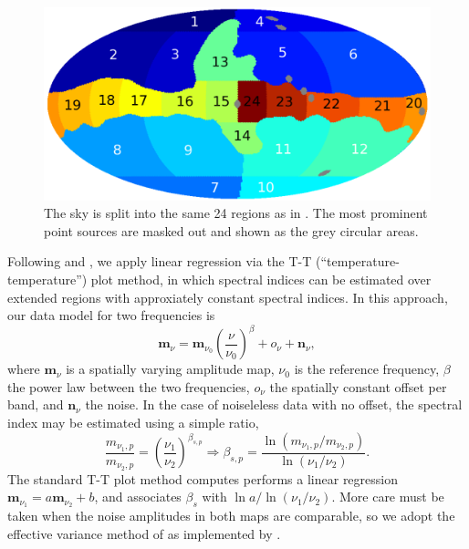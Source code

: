 \documentclass[twocolumn]{../../common/aa}
\begin{document}
\begin{figure}
        \centering
        \includegraphics[width=\linewidth]{figures/utnymaske_tall_converted.pdf}
        \caption{The sky is split into the same 24 regions as in \citet{fuskeland2014}. The most prominent point sources are masked out and shown as the grey circular areas.
        }
        \label{fig:regions}
\end{figure}


Following \citet{fuskeland2014} and \citet{fuskeland:2019}, we apply linear regression via the T-T (``temperature-temperature'') plot method, in which spectral indices can be estimated over extended regions with approxiately constant spectral indices. In this approach, our data model for two frequencies is
\begin{equation}
	\boldsymbol m_\nu = \boldsymbol m_{\nu_0}\left(\frac\nu{\nu_0}\right)^\beta+o_\nu+\boldsymbol n_\nu ,
\end{equation}
where $\boldsymbol m_\nu$ is a spatially varying amplitude map, $\nu_0$ is the reference frequency, $\beta$ the power law between the two frequencies, $o_\nu$ the spatially constant offset per band, and $\boldsymbol n_\nu$ the noise.  In the case of noiseleless data with no offset, the spectral index may be estimated using a simple ratio,
\begin{equation}
	\frac{m_{\nu_1,p}}{m_{\nu_2,p}}
	=\left(\frac{\nu_1}{\nu_2}\right)^{\beta_{s,p}}
	\Rightarrow
	\beta_{s,p}=\frac{\ln(m_{\nu_1,p}/m_{\nu_2,p})}{\ln(\nu_1/\nu_2)}.
\end{equation}
The standard T-T plot method computes performs a linear regression $\boldsymbol m_{\nu_1}=a\boldsymbol m_{\nu_2}+b$, and associates $\beta_s$ with $\ln a/\ln(\nu_1/\nu_2)$. More care must be taken when the noise amplitudes in both maps are comparable, so we adopt the effective variance method of \citet{orear1982} as implemented by \citet{fuskeland2014}.
\end{document}
